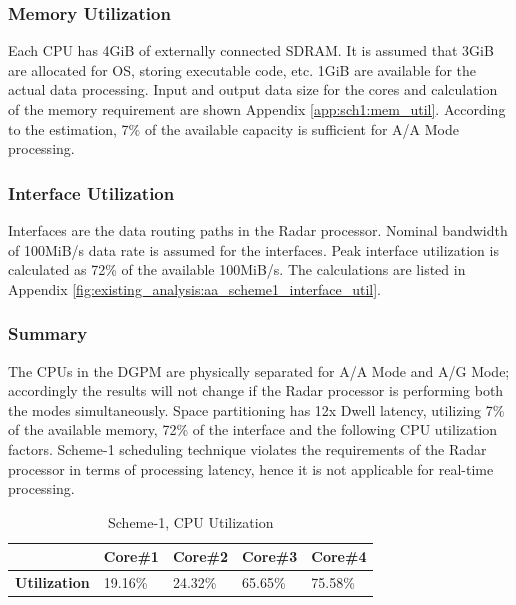 \subsubsection{Memory Utilization}
\label{sec:scheme1:mem_util}
Each CPU has 4GiB of externally connected SDRAM. It is assumed that 3GiB are allocated for OS, storing executable code, etc. 1GiB are available for the actual data processing. Input and output data size for the cores and calculation of the memory requirement are shown Appendix \ref{app:sch1:mem_util}. According to the estimation, 7\% of the available capacity is sufficient for A/A Mode processing.

\subsubsection{Interface Utilization}
\label{sec:scheme1:aa_interface_util}
Interfaces are the data routing paths in the Radar processor. Nominal bandwidth of 100MiB/s data rate is assumed for the interfaces.  Peak interface utilization is calculated as 72\% of the available 100MiB/s. The calculations are listed in Appendix \ref{fig:existing_analysis:aa_scheme1_interface_util}.

\subsubsection{Summary}
The CPUs in the DGPM are physically separated for A/A Mode and A/G Mode; accordingly the results will not change if the Radar processor is performing both the modes simultaneously. Space partitioning has 12x Dwell latency, utilizing 7\% of the available memory, 72\% of the interface and the following CPU utilization factors. Scheme-1 scheduling technique violates the requirements of the Radar processor in terms of processing latency, hence it is not applicable for real-time processing.

\begin{table}[h!]
	\centering
	\begin{tabular}{|l|l|l|l|l|} 
	 \hline
	& \textbf{Core\#1} & \textbf{Core\#2} & \textbf{Core\#3} & \textbf{Core\#4} \\ \hline
	\textbf{Utilization} & 19.16\% & 24.32\% & 65.65\% & 75.58\% \\ \hline
	\end{tabular}
	\caption{Scheme-1, CPU Utilization}
\end{table}



